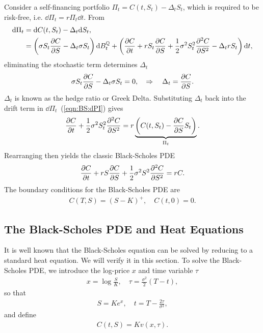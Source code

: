 \documentclass{book}
\begin{document}
Consider a self-financing portfolio $\Pi_t = C(t, S_t) - \Delta_t S_t$, which is required to be risk-free, i.e. $\dd \Pi_t = r \Pi_t \dd t$. 
From 
\begin{align}
    \dd \Pi_t &= \dd C(t, S_t) - \Delta_t \dd S_t, \notag\\ 
    \label{eqn:BS:dPI}
    &= \left(\sigma S_t {\pdv{C}{S}} - \Delta_t \sigma S_t \right)\dd B_t^\mathbb{Q} + 
    \left(
    \pdv{C}{t} + rS_t {\pdv{C}{S}} + \frac{1}{2} \sigma^2 S_t^2 {\pdv[2]{C}{S}} - \Delta_t r S_t
    \right)
    \dd t,
\end{align}
eliminating the stochastic term determines $\Delta_t$
\begin{align}
    \sigma S_t {\pdv{C}{S}} - \Delta_t \sigma S_t  = 0,\quad \Rightarrow\quad \Delta_t = {\pdv{C}{S}}.
\end{align}
$\Delta_t$ is known as the hedge ratio or Greek Delta.
Substituting $\Delta_t$ back into the drift term in $\dd \Pi_t$~(\ref{eqn:BS:dPI}) gives
\begin{align*}
    \pdv{C}{t} + \frac{1}{2} \sigma^2 S_t^2 {\pdv[2]{C}{S}} = r \underbrace{\left(C(t, S_t) - \pdv{C}{S} S_t\right)}_{\Pi_t}.
\end{align*}
Rearranging then yields the classic Black-Scholes PDE
\begin{align}
    \label{eqn:BS:Black-Scholes-Equation}
    \pdv{C}{t} + r S \pdv{C}{S} +\frac{1}{2}\sigma^2 S^2 \pdv[2]{C}{S} = rC.
\end{align}
The boundary conditions for the Black-Scholes PDE are
\begin{align}
    C(T,S) = (S-K)^+,\quad C(t,0) = 0.
\end{align}

\subsection{The Black-Scholes PDE and Heat Equations}

It is well known that the Black-Scholes equation can be solved by reducing to a standard heat equation. We will verify it in this section. To solve the Black-Scholes PDE, we introduce the log-price $x$ and time variable $\tau$
\begin{align}
    \label{eqn:BS-heat:var-tf-x-S-and-t-tau}
    x = \log\frac{S}{K},\quad \tau = \frac{\sigma^2}{2}(T - t),
\end{align}
so that
\begin{align}
    \label{eqn:BS-heat:var-tf-S-x-and-t-tau}
    S = K e^x, \quad t = T - \frac{2\tau}{\sigma^2},
\end{align}
and define
\begin{align}
    \label{eqn:BS-heat:var-tf-C-v}
    C(t, S) = Kv(x,\tau).
\end{align}
\end{document}
